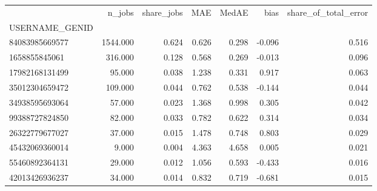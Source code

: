 \begin{tabular}{lrrrrrr}
\toprule
 & n_jobs & share_jobs & MAE & MedAE & bias & share_of_total_error \\
USERNAME_GENID &  &  &  &  &  &  \\
\midrule
84083985669577 & 1544.000 & 0.624 & 0.626 & 0.298 & -0.096 & 0.516 \\
1658855845061 & 316.000 & 0.128 & 0.568 & 0.269 & -0.013 & 0.096 \\
17982168131499 & 95.000 & 0.038 & 1.238 & 0.331 & 0.917 & 0.063 \\
35012304659472 & 109.000 & 0.044 & 0.762 & 0.538 & -0.144 & 0.044 \\
34938595693064 & 57.000 & 0.023 & 1.368 & 0.998 & 0.305 & 0.042 \\
99388727824850 & 82.000 & 0.033 & 0.782 & 0.622 & 0.314 & 0.034 \\
26322779677027 & 37.000 & 0.015 & 1.478 & 0.748 & 0.803 & 0.029 \\
45432069360014 & 9.000 & 0.004 & 4.363 & 4.658 & 0.005 & 0.021 \\
55460892364131 & 29.000 & 0.012 & 1.056 & 0.593 & -0.433 & 0.016 \\
42013426936237 & 34.000 & 0.014 & 0.832 & 0.719 & -0.681 & 0.015 \\
\bottomrule
\end{tabular}
